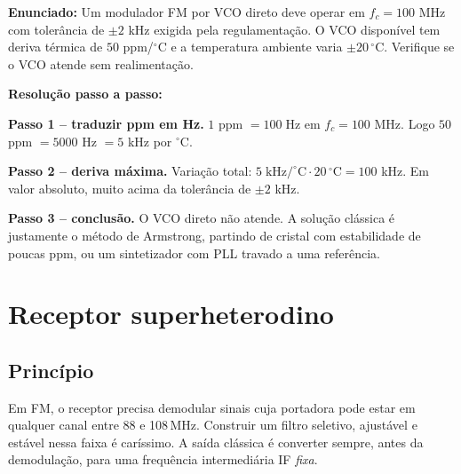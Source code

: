 \documentclass[11pt,a4paper]{article}
\begin{document}
\begin{exercicio}
\textbf{Enunciado:} Um modulador FM por VCO direto deve operar em $f_c=100$ MHz com tolerância de $\pm 2$ kHz exigida pela regulamentação. O VCO disponível tem deriva térmica de $50$ ppm/$^\circ$C e a temperatura ambiente varia $\pm 20\,^\circ$C. Verifique se o VCO atende sem realimentação.

\textbf{Resolução passo a passo:}

\textbf{Passo 1 -- traduzir ppm em Hz.}
$1$ ppm $= 100\;\text{Hz}$ em $f_c=100$ MHz. Logo $50$ ppm $=5000$ Hz $=5$ kHz por $^\circ$C.

\textbf{Passo 2 -- deriva máxima.}
Variação total: $5\;\text{kHz/}^\circ\text{C} \cdot 20\,^\circ\text{C} = 100$ kHz. Em valor absoluto, muito acima da tolerância de $\pm 2$ kHz.

\textbf{Passo 3 -- conclusão.}
O VCO direto não atende. A solução clássica é justamente o método de Armstrong, partindo de cristal com estabilidade de poucas ppm, ou um sintetizador com PLL travado a uma referência.
\end{exercicio}

\section{Receptor superheterodino}

\subsection{Princípio}

Em FM, o receptor precisa demodular sinais cuja portadora pode estar em qualquer canal entre 88 e 108\,MHz. Construir um filtro seletivo, ajustável e estável nessa faixa é caríssimo. A saída clássica é converter sempre, antes da demodulação, para uma frequência intermediária IF \emph{fixa}.

\begin{center}
\end{center}
\end{document}
